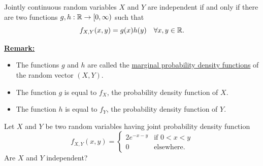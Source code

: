 \begin{theorem}
Jointly continuous random variables $X$ and $Y$ are independent if and only if there are two functions $g, h : \mathbb{R} \rightarrow [0 , \infty )$ such that
    \[
        f_{X, Y} (x, y) = g(x) h(y) \quad \forall x, y \in \mathbb{R} .
    \]
\end{theorem}

\underline{\textbf{Remark:}} 
    \begin{itemize}
        \item The functions $g$ and $h$ are called the \underline{marginal probability density functions} of the random vector $(X, Y)$. 
        \item The function $g$ is equal to $f_X$, the probability density function of $X$.
        \item The function $h$ is equal to $f_Y$, the probability density function of $Y$.
    \end{itemize}




\begin{example}\label{Example:NonIndependence}
Let $X$ and $Y$ be two random variables having joint probability density function
    \[
        f_{X, Y} (x, y) = \left\lbrace \begin{matrix} 2 e^{-x - y} & \text{if } 0 < x < y \\
        0 & \text{elsewhere.} \end{matrix} \right. 
    \]
Are $X$ and $Y$ independent?
\end{example}

